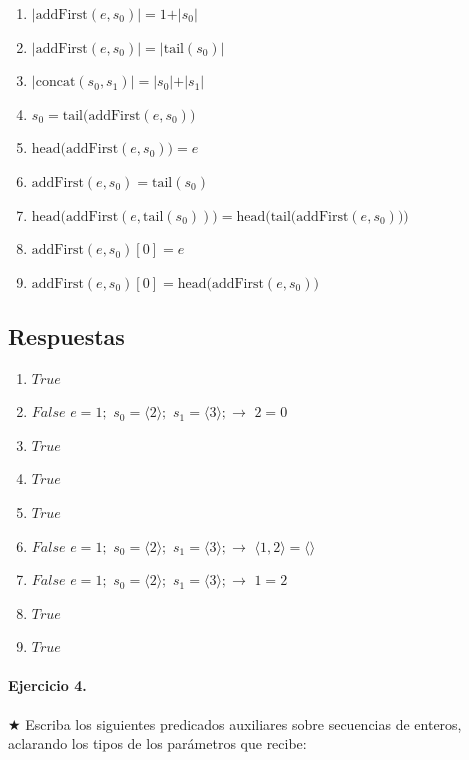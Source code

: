 \documentclass[a4paper]{article}
\begin{document}
\begin{enumerate}[label=\alph*)]
\item $\vert \textrm{addFirst}(e,s_0)\vert =1+ \vert s_0\vert$
\item $\vert \textrm{addFirst}(e,s_0)\vert = \vert \textrm{tail}(s_0)\vert $
\item $\vert \textrm{concat}(s_0,s_1)\vert = \vert s_0 \vert +\vert s_1\vert $
\item $s_0 = \textrm{tail(addFirst}(e,s_0))$
\item $\textrm{head(addFirst}(e,s_0))=e$
\item $\textrm{addFirst}(e,s_0)=\textrm{tail}(s_0)$
\item $\textrm{head(addFirst}(e,\textrm{tail}(s_0)))=\textrm{head(tail(addFirst}(e,s_0)))$
\item $\textrm{addFirst}(e,s_0)[0]=e$
\item $\textrm{addFirst}(e,s_0)[0]=\textrm{head(addFirst}(e,s_0))$
\end{enumerate}

\subsection*{Respuestas}

\begin{enumerate}[label=\alph*)]
\item $True$
\item $False$ $e=1;$ $s_0=\langle 2\rangle ;$ $s_1=\langle 3\rangle ;\rightarrow$  $2=0$
\item $True$
\item $True$
\item $True$
\item $False$ $e=1;$ $s_0=\langle 2\rangle ;$ $s_1=\langle 3\rangle ;\rightarrow$  $\langle 1,2\rangle =\langle \rangle$
\item $False$ $e=1;$ $s_0=\langle 2\rangle ;$ $s_1=\langle 3\rangle ;\rightarrow$  $ 1 = 2$
\item $True$
\item $True$
\end{enumerate}

\paragraph{Ejercicio 4.} $\bigstar$ Escriba los siguientes predicados auxiliares sobre secuencias de enteros, aclarando los tipos de los parámetros que recibe:
\end{document}
